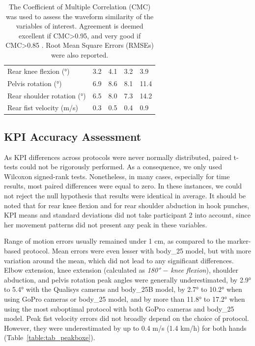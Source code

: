 \begin{table}[!ht]
{\begin{tabular}{lllll}
          \cmidrule(l{2pt}r{2pt}){2-5}
          Rear knee flexion (°) & 3.2 & 4.1 & 3.2 & 3.9\\
          Pelvis rotation (°) & 6.9 & 8.6 & 8.1 & 11.4\\
          Rear shoulder rotation (°) & 6.5 & 8.0 & 7.3 & 14.2 \\
          Rear fist velocity (m/s) & 0.3 & 0.5 & 0.4 & 0.9\\
          \bottomrule
      \end{tabular}}
      \caption{The Coefficient of Multiple Correlation (CMC) was used to assess the waveform similarity of the variables of interest. Agreement is deemed excellent if CMC>0.95, and very good if CMC>0.85 \cite{Ferrari2010}. Root Mean Square Errors (RMSEs) were also reported.}
      \label{table:tab_cmcboxe}
\end{table}


\subsection{KPI Accuracy Assessment}

As KPI differences across protocols were never normally distributed, paired t-tests could not be rigorously performed. As a consequence, we only used Wilcoxon signed-rank tests. Nonetheless, in many cases, especially for time results, most paired differences were equal to zero. In these instances, we could not reject the null hypothesis that results were identical in average. It should be noted that for rear knee flexion and for rear shoulder abduction in hook punches, KPI means and standard deviations did not take participant 2 into account, since her movement patterns did not present any peak in these variables.

Range of motion errors usually remained under 1 cm, as compared to the marker-based protocol. Mean errors were even lesser with body\_25 model, but with more variation around the mean, which did not lead to any significant differences. Elbow extension, knee extension (calculated as \textit{180° $-$ knee flexion}), shoulder abduction, and pelvis rotation peak angles were generally underestimated, by 2.9° to 5.4° with the Qualisys cameras and body\_25B model, by 2.7° to 10.2° when using GoPro cameras or body\_25 model, and by more than 11.8° to 17.2° when using the most suboptimal protocol with both GoPro cameras and body\_25 model. Peak fist velocity errors did not broadly depend on the choice of protocol. However, they were underestimated by up to 0.4 m/s (1.4 km/h) for both hands (Table~\ref{table:tab_peakboxe}).

